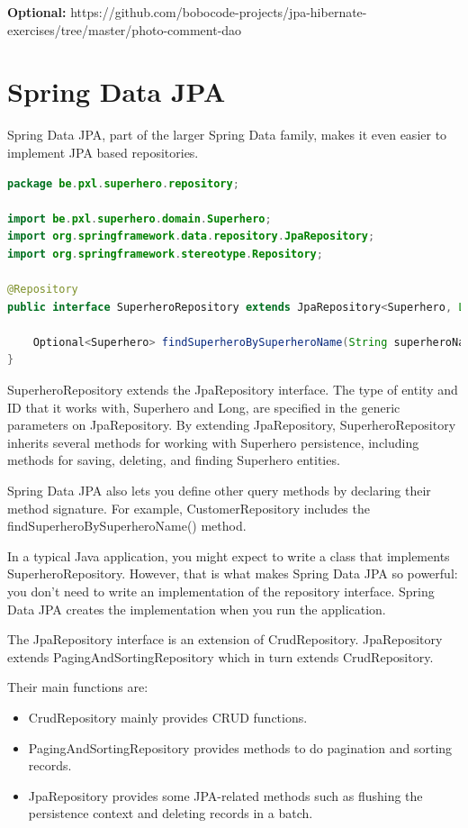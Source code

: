 \begin{oefening}
\textbf{Optional:} 
https://github.com/bobocode-projects/jpa-hibernate-exercises/tree/master/photo-comment-dao
\end{oefening}


\section{Spring Data JPA}

Spring Data JPA, part of the larger Spring Data family, makes it even easier to implement JPA based repositories.


\begin{lstlisting}[frame=single, language=java]
package be.pxl.superhero.repository;

import be.pxl.superhero.domain.Superhero;
import org.springframework.data.repository.JpaRepository;
import org.springframework.stereotype.Repository;

@Repository
public interface SuperheroRepository extends JpaRepository<Superhero, Long> {

	Optional<Superhero> findSuperheroBySuperheroName(String superheroName);
}
\end{lstlisting}

SuperheroRepository extends the JpaRepository interface. The type of entity and ID that it works with, Superhero and Long, are specified in the generic parameters on JpaRepository. By extending JpaRepository, SuperheroRepository inherits several methods for working with Superhero persistence, including methods for saving, deleting, and finding Superhero entities.

Spring Data JPA also lets you define other query methods by declaring their method signature. For example, CustomerRepository includes the findSuperheroBySuperheroName() method.

In a typical Java application, you might expect to write a class that implements SuperheroRepository. However, that is what makes Spring Data JPA so powerful: you don't need to write an implementation of the repository interface. Spring Data JPA creates the implementation when you run the application.

The JpaRepository interface is an extension of CrudRepository.
JpaRepository extends PagingAndSortingRepository which in turn extends CrudRepository.

Their main functions are:

\begin{itemize}
\item CrudRepository mainly provides CRUD functions.
\item PagingAndSortingRepository provides methods to do pagination and sorting records.
\item JpaRepository provides some JPA-related methods such as flushing the persistence context and deleting records in a batch.
\end{itemize}

